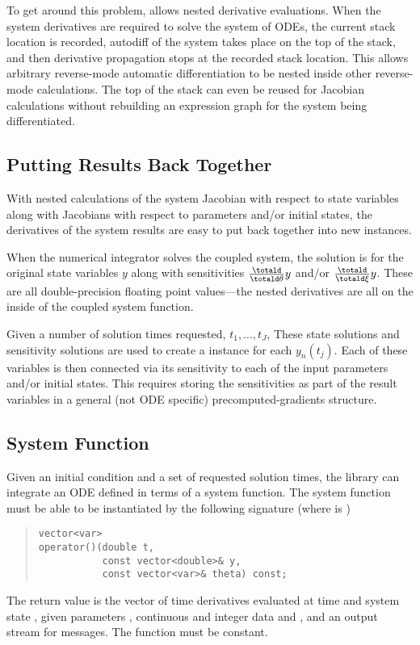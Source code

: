 \documentclass[10pt]{article}
\begin{document}
To get around this problem,  allows nested
derivative evaluations.  When the system derivatives are required to
solve the system of ODEs, the current stack location is recorded,
autodiff of the system takes place on the top of the stack, and then
derivative propagation stops at the recorded stack location.  This
allows arbitrary reverse-mode automatic differentiation to be nested
inside other reverse-mode calculations.  The top of the stack can even
be reused for Jacobian calculations without rebuilding an expression
graph for the system being differentiated.

\subsection{Putting Results Back Together}

With nested calculations of the system Jacobian with respect to state
variables along with Jacobians with respect to parameters and/or
initial states, the derivatives of the system results are easy to put
back together into new  instances.  

When the numerical integrator solves the coupled system, the solution
is for the original state variables $y$ along with sensitivities
$\frac{\totald}{\totald \theta} y$ and/or $\frac{\totald}{\totald \xi}
y$.  These are all double-precision floating point values---the nested
derivatives are all on the inside of the coupled system function.

Given a number of solution times requested, $t_1,\ldots,t_J$, These
state solutions and sensitivity solutions are used to create a
 instance for each $y_n(t_j)$.  Each of these variables is
then connected via its sensitivity to each of the input parameters
and/or initial states.  This requires storing the sensitivities as
part of the result variables in a general (not ODE specific)
precomputed-gradients  structure.

\subsection{System Function}

Given an initial condition and a set of requested solution times, the
 library can integrate an ODE defined in terms of a
system function.  The system function must be able to be instantiated
by the following signature (where  is )
%
\begin{quote}
\begin{Verbatim}
vector<var>
operator()(double t, 
           const vector<double>& y,
           const vector<var>& theta) const;
\end{Verbatim}
\end{quote}
%
The return value is the vector of time derivatives evaluated at time
 and system state , given parameters ,
continuous and integer data  and , and an output
stream  for messages.  The function must be constant.
\end{document}
